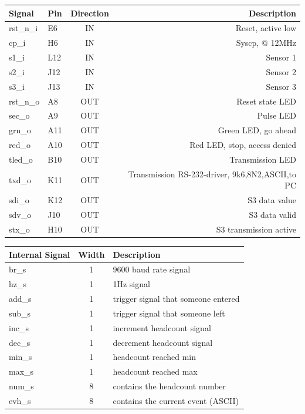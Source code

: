 \documentclass[12pt,a4 paper] {report}
\begin{document}
\begin{center}
	\begin{tabular}{|l|l|c|r|}
		\hline
		\textbf{Signal} & \textbf{Pin} & \textbf{Direction} & \textbf{Description} \\
		\hline
		\hline
		rst\_n\_i & E6 & IN & Reset, active low \\
		\hline
		cp\_i & H6 & IN & Syscp, @ 12MHz \\
		\hline
		s1\_i & L12 & IN & Sensor 1 \\
		\hline
		s2\_i & J12 & IN & Sensor 2 \\
		\hline
		s3\_i & J13 & IN & Sensor 3 \\
		\hline
		rst\_n\_o & A8 & OUT & Reset state LED  \\
		\hline
		sec\_o & A9 & OUT & Pulse LED \\
		\hline
		grn\_o & A11 & OUT & Green LED, go ahead \\
		\hline
		red\_o & A10 & OUT & Red LED, stop, access denied \\
		\hline
		tled\_o & B10 & OUT & Transmission LED \\
		\hline
		txd\_o & K11 & OUT & Transmission RS-232-driver, 9k6,8N2,ASCII,to PC \\
		\hline
		sdi\_o & K12 & OUT & S3 data value \\
		\hline
		sdv\_o & J10 & OUT & S3 data valid \\
		\hline
		stx\_o & H10 & OUT & S3 transmission active \\
		\hline
	\end{tabular}
\end{center}
\begin{center}
	\begin{tabular}{ | p{2cm} | c | p{5cm} |}
		\hline
		\textbf{Internal Signal} & \textbf{Width} & \textbf{Description} \\
		\hline
		br\_s & 1 & 9600 baud rate signal \\
		\hline
		hz\_s & 1 & 1Hz signal \\
		\hline
		add\_s & 1 & trigger signal that someone entered \\
		\hline
		sub\_s & 1 & trigger signal that someone left \\
		\hline
		inc\_s & 1 & increment headcount signal \\
		\hline
		dec\_s & 1 & decrement headcount signal \\
		\hline
		min\_s & 1 & headcount reached min \\
		\hline
		max\_s & 1 & headcount reached max \\
		\hline
		num\_s & 8 & contains the headcount number \\
		\hline
		evh\_s & 8 & contains the current event (ASCII) \\
		\hline
	\end{tabular}
\end{center}
\end{document}
